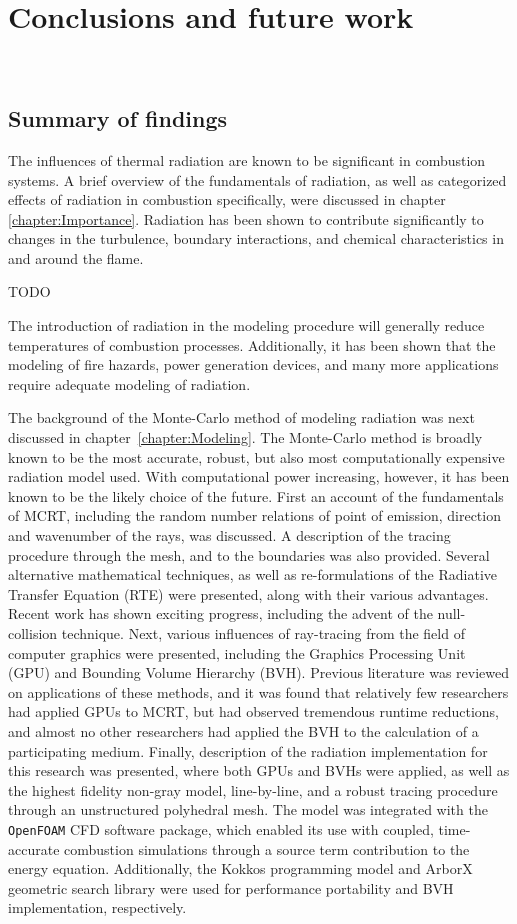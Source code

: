 \addchapheadtotoc
\chapter{Conclusions and future work}~\label{chapter:conclusion}

\section{Summary of findings}
The influences of thermal radiation are known to be significant in combustion systems. A brief overview of the fundamentals of radiation, as well as categorized effects of radiation in combustion specifically, were discussed in chapter \ref{chapter:Importance}. 
Radiation has been shown to contribute significantly to changes in the turbulence, boundary interactions, and chemical characteristics in and around the flame.

TODO

The introduction of radiation in the modeling procedure will generally reduce temperatures of combustion processes. 
Additionally, it has been shown that the modeling of fire hazards, power generation devices, and many more applications require adequate modeling of radiation. 

The background of the Monte-Carlo method of modeling radiation was next discussed in chapter~\ref{chapter:Modeling}. The Monte-Carlo method is broadly known to be the most accurate, robust, but also most computationally expensive radiation model used.
With computational power increasing, however, it has been known to be the likely choice of the future. First an account of the fundamentals of MCRT, including the random number relations of point of emission, direction and wavenumber of the rays, was discussed.
A description of the tracing procedure through the mesh, and to the boundaries was also provided.
Several alternative mathematical techniques, as well as re-formulations of the Radiative Transfer Equation (RTE) were presented, along with their various advantages. Recent work has shown exciting progress, including the advent of the null-collision technique. Next, various influences of ray-tracing from the field of computer graphics were presented, including the Graphics Processing Unit (GPU) and Bounding Volume Hierarchy (BVH).
Previous literature was reviewed on applications of these methods, and it was found that relatively few researchers had applied GPUs to MCRT, but had observed tremendous runtime reductions, and almost no other researchers had applied the BVH to the calculation of a participating medium.
Finally, description of the radiation implementation for this research was presented, where both GPUs and BVHs were applied, as well as the highest fidelity non-gray model, line-by-line, and a robust tracing procedure through an unstructured polyhedral mesh.
The model was integrated with the \verb|OpenFOAM| CFD software package, which enabled its use with coupled, time-accurate combustion simulations through a source term contribution to the energy equation. Additionally, the Kokkos programming model and ArborX geometric search library were used for performance portability and BVH implementation, respectively.

